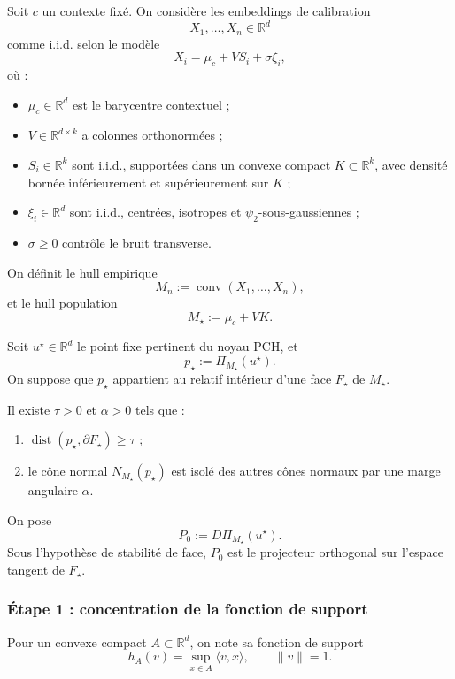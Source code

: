 Soit \(c\) un contexte fixé. On considère les embeddings de calibration
\[
X_1,\dots,X_n\in\mathbb R^d
\]
comme i.i.d. selon le modèle
\[
X_i=\mu_c+VS_i+\sigma\xi_i,
\]
où :
\begin{itemize}
    \item \(\mu_c\in\mathbb R^d\) est le barycentre contextuel ;
    \item \(V\in\mathbb R^{d\times k}\) a colonnes orthonormées ;
    \item \(S_i\in\mathbb R^k\) sont i.i.d., supportées dans un convexe compact \(K\subset\mathbb R^k\), avec densité bornée inférieurement et supérieurement sur \(K\) ;
    \item \(\xi_i\in\mathbb R^d\) sont i.i.d., centrées, isotropes et \(\psi_2\)-sous-gaussiennes ;
    \item \(\sigma\ge 0\) contrôle le bruit transverse.
\end{itemize}

On définit le hull empirique
\[
M_n:=\operatorname{conv}(X_1,\dots,X_n),
\]
et le hull population
\[
M_\star:=\mu_c+VK.
\]

Soit \(u^\star\in\mathbb R^d\) le point fixe pertinent du noyau PCH, et
\[
p_\star:=\Pi_{M_\star}(u^\star).
\]
On suppose que \(p_\star\) appartient au relatif intérieur d'une face \(F_\star\) de \(M_\star\).

\begin{assumption}
Il existe \(\tau>0\) et \(\alpha>0\) tels que :
\begin{enumerate}
    \item \(\operatorname{dist}(p_\star,\partial F_\star)\ge \tau\) ;
    \item le cône normal \(N_{M_\star}(p_\star)\) est isolé des autres cônes normaux par une marge angulaire \(\alpha\).
\end{enumerate}
\end{assumption}

On pose
\[
P_0:=D\Pi_{M_\star}(u^\star).
\]
Sous l'hypothèse de stabilité de face, \(P_0\) est le projecteur orthogonal sur l'espace tangent de \(F_\star\).

\subsubsection{Étape 1 : concentration de la fonction de support}

Pour un convexe compact \(A\subset\mathbb R^d\), on note sa fonction de support
\[
h_A(v)=\sup_{x\in A}\langle v,x\rangle,
\qquad \|v\|=1.
\]

